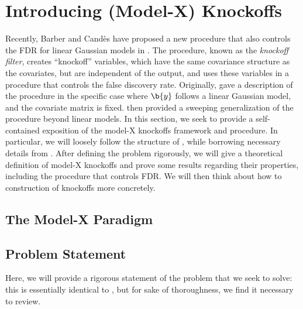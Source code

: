 \documentclass[11pt,reqno]{report}
\theoremstyle{definition}
\numberwithin{equation}{section}
\begin{document}
\chapter{Introducing (Model-X) Knockoffs}
\label{chapter2}

Recently, Barber and Cand\`{e}s have proposed a new procedure that also controls the FDR for linear Gaussian models in \cite{knockoffs}. The procedure, known as the \emph{knockoff filter}, creates ``knockoff'' variables, which have the same covariance structure as the covariates, but are independent of the output, and uses these variables in a procedure that controls the false discovery rate. Originally, \cite{knockoffs} gave a description of the procedure in the specific case where $\b{y}$ follows a linear Gaussian model, and the covariate matrix is fixed. \cite{panning} then provided a sweeping generalization of the procedure beyond linear models. In this section, we seek to provide a self-contained exposition of the model-X knockoffs framework and procedure. In particular, we will loosely follow the structure of \cite{panning}, while borrowing necessary details from \cite{knockoffs}. After defining the problem rigorously, we will give a theoretical definition of model-X knockoffs and prove some results regarding their properties, including the procedure that controls FDR. We will then think about how to construction of knockoffs more concretely.

\section{The Model-X Paradigm}

\section{Problem Statement}
Here, we will provide a rigorous statement of the problem that we seek to solve: this is essentially identical to \cite{panning}, but for sake of thoroughness, we find it necessary to review.
\end{document}
